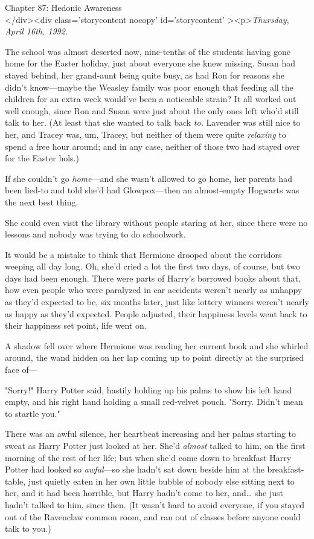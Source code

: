 
Chapter 87: Hedonic Awareness\\
</div><div  class='storycontent nocopy' id='storycontent' ><p>\emph{Thursday, 
April 16th, 1992.}

The school was almost deserted now, nine-tenths of the students having gone 
home for the Easter holiday, just about everyone she knew missing. Susan had 
stayed behind, her grand-aunt being quite busy, as had Ron for reasons she 
didn't know---maybe the Weasley family was poor enough that feeding all the 
children for an extra week would've been a noticeable strain? It all worked out 
well enough, since Ron and Susan were just about the only ones left who'd still 
talk to her. (At least that she wanted to talk back \emph{to.} Lavender was 
still nice to her, and Tracey was, um, Tracey, but neither of them were quite 
\emph{relaxing} to spend a free hour around; and in any case, neither of those 
two had stayed over for the Easter hols.)

If she couldn't go \emph{home}---and she wasn't allowed to go home, her parents 
had been lied-to and told she'd had Glowpox---then an almost-empty Hogwarts was 
the next best thing.

She could even visit the library without people staring at her, since there 
were no lessons and nobody was trying to do schoolwork.

It would be a mistake to think that Hermione drooped about the corridors 
weeping all day long. Oh, she'd cried a lot the first two days, of course, but 
two days had been enough. There were parts of Harry's borrowed books about 
that, how even people who were paralyzed in car accidents weren't nearly as 
unhappy as they'd expected to be, six months later, just like lottery winners 
weren't nearly as happy as they'd expected. People adjusted, their happiness 
levels went back to their happiness set point, life went on.

A shadow fell over where Hermione was reading her current book and she whirled 
around, the wand hidden on her lap coming up to point directly at the surprised 
face of---

"Sorry!" Harry Potter said, hastily holding up his palms to show his left hand 
empty, and his right hand holding a small red-velvet pouch. "Sorry. Didn't mean 
to startle you."

There was an awful silence, her heartbeat increasing and her palms starting to 
sweat as Harry Potter just looked at her. She'd \emph{almost} talked to him, on 
the first morning of the rest of her life; but when she'd come down to 
breakfast Harry Potter had looked so \emph{awful}---so she hadn't sat down 
beside him at the breakfast-table, just quietly eaten in her own little bubble 
of nobody else sitting next to her, and it had been horrible, but Harry hadn't 
come to her, and{\ldots} she just hadn't talked to him, since then. (It wasn't 
hard to avoid everyone, if you stayed out of the Ravenclaw common room, and ran 
out of classes before anyone could talk to you.)

